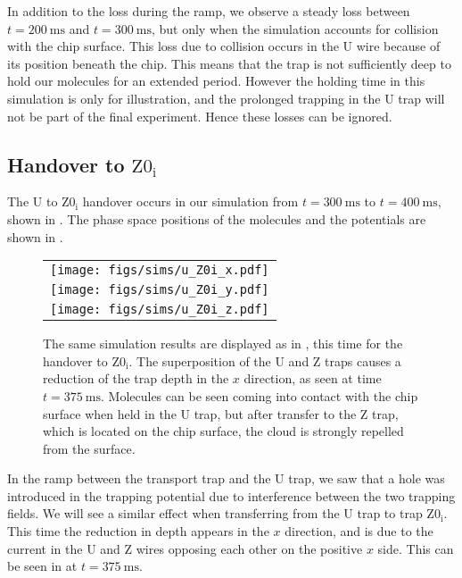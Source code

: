 In addition to the loss during the ramp, we observe a steady loss between
$t=\SI{200}{\milli\second}$ and $t=\SI{300}{\milli\second}$, but only when the
simulation accounts for collision with the chip surface. This loss due to
collision occurs in the U wire because of its position beneath the chip. This
means that the trap is not sufficiently deep to hold our molecules for an
extended period. However the holding time in this simulation is only for
illustration, and the prolonged trapping in the U trap will not be part of the
final experiment. Hence these losses can be ignored.

\subsection{Handover to $\mathrm{Z0_i}$}
\label{design:sim:U_to_Z0i}

The U to $\mathrm{Z0_i}$ handover occurs in our simulation from
$t=\SI{300}{\milli\second}$ to $t=\SI{400}{\milli\second}$, shown in
.  The phase space positions of the
molecules and the potentials are shown in .

\begin{figure}[p]
\centering
  \begin{tabular}{c}
    \texttt{[image: figs/sims/u\_Z0i\_x.pdf]} \\
    \texttt{[image: figs/sims/u\_Z0i\_y.pdf]} \\
    \texttt{[image: figs/sims/u\_Z0i\_z.pdf]}
  \end{tabular}
  \caption{
    The same simulation results are displayed as in
    , this time for the handover to $\mathrm{Z0_i}$.
    The superposition of the U and Z traps causes a reduction of the trap depth
    in the $x$ direction, as seen at time $t=\SI{375}{\milli\second}$.
    Molecules can be seen coming into contact with the chip surface when held
    in the U trap, but after transfer to the Z trap, which is located on the
    chip surface, the cloud is strongly repelled from the surface.
  }
  \label{design:fig:U_Z0i}
\end{figure}

In the ramp between the transport trap and the U trap, we saw that a hole was
introduced in the trapping potential due to interference between the two
trapping fields. We will see a similar effect when transferring from the U trap
to trap $\mathrm{Z0_i}$.  This time the reduction in depth appears in the $x$
direction, and is due to the current in the U and Z wires opposing each other
on the positive $x$ side. This can be seen in  at
$t=\SI{375}{\milli\second}$.

